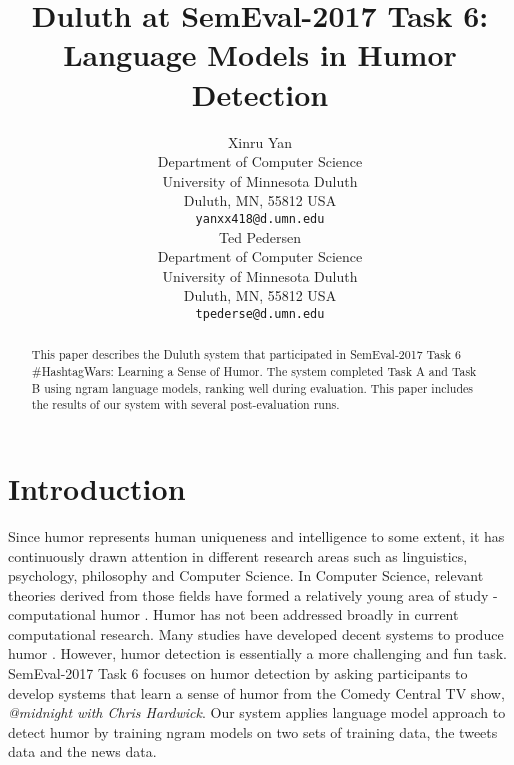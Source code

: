 \documentclass[11pt,a4paper]{article}
\title{Duluth at SemEval-2017 Task 6:  Language Models in Humor Detection}
\author{Xinru Yan \\
  Department of Computer Science \\ University of Minnesota Duluth \\ Duluth, MN, 55812 USA \\
  {\tt yanxx418@d.umn.edu} \\\And
  Ted Pedersen \\
  Department of Computer Science \\ University of Minnesota Duluth \\ Duluth, MN, 55812 USA \\
  {\tt tpederse@d.umn.edu} \\}
\date{}
\begin{document}
\maketitle
\begin{abstract}
  This paper describes the Duluth system that participated in SemEval-2017 Task 6 \#HashtagWars: Learning a Sense of Humor. The system completed Task A and Task B using ngram language models, ranking well during evaluation. This paper includes the results of our system with several post-evaluation runs. 
\end{abstract}

\section{Introduction}
Since humor represents human uniqueness and intelligence to some extent, it has continuously drawn attention in different research areas such as linguistics, psychology, philosophy and Computer Science. In Computer Science, relevant theories derived from those fields have formed a relatively young area of study - computational humor \cite{Recognizing:Humor:On:Twitter}. Humor has not been addressed broadly in current computational research. Many studies have developed decent systems to produce humor \cite{ozbal2012computational}. However, humor detection is essentially a more challenging and fun task. SemEval-2017 Task 6 focuses on humor detection by asking participants to develop systems that learn a sense of humor from the Comedy Central TV show, \textit{@midnight with Chris Hardwick}. Our system applies language model approach to detect humor by training ngram models on two sets of training data, the tweets data and the news data.\\
\end{document}
